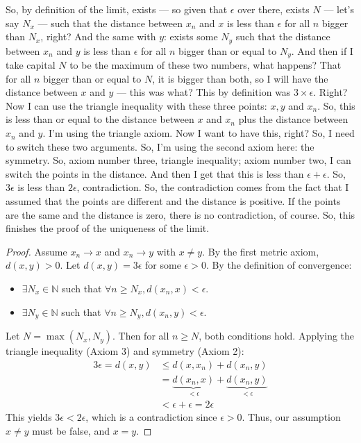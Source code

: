\begin{spoken-clean}[00:11:03 - 00:12:38]
So, by definition of the limit, exists — so given that $\epsilon$ over there, exists $N$ — let's say $N_x$ — such that the distance between $x_n$ and $x$ is less than $\epsilon$ for all $n$ bigger than $N_x$, right? And the same with $y$: exists some $N_y$ such that the distance between $x_n$ and $y$ is less than $\epsilon$ for all $n$ bigger than or equal to $N_y$. And then if I take capital $N$ to be the maximum of these two numbers, what happens? That for all $n$ bigger than or equal to $N$, it is bigger than both, so I will have the distance between $x$ and $y$ — this was what? This by definition was $3 \times \epsilon$. Right? Now I can use the triangle inequality with these three points: $x, y$ and $x_n$. So, this is less than or equal to the distance between $x$ and $x_n$ plus the distance between $x_n$ and $y$. I'm using the triangle axiom. Now I want to have this, right? So, I need to switch these two arguments. So, I'm using the second axiom here: the symmetry. So, axiom number three, triangle inequality; axiom number two, I can switch the points in the distance. And then I get that this is less than $\epsilon + \epsilon$. So, $3\epsilon$ is less than $2\epsilon$, contradiction. So, the contradiction comes from the fact that I assumed that the points are different and the distance is positive. If the points are the same and the distance is zero, there is no contradiction, of course. So, this finishes the proof of the uniqueness of the limit.
\end{spoken-clean}

\begin{math-stroke}
\begin{proof}
Assume $x_n \to x$ and $x_n \to y$ with $x \neq y$. By the first metric axiom, $d(x, y) > 0$. Let $d(x, y) = 3\epsilon$ for some $\epsilon > 0$.
By the definition of convergence:
\begin{itemize}
    \setcounter{enumi}{0} \item $\exists N_x \in \mathbb{N}$ such that $\forall n \ge N_x, d(x_n, x) < \epsilon$.
    \setcounter{enumi}{1} \item $\exists N_y \in \mathbb{N}$ such that $\forall n \ge N_y, d(x_n, y) < \epsilon$.
\end{itemize}
Let $N = \max(N_x, N_y)$. Then for all $n \ge N$, both conditions hold. Applying the triangle inequality (Axiom 3) and symmetry (Axiom 2):
\begin{align*}
3\epsilon = d(x, y) &\le d(x, x_n) + d(x_n, y) \\
&= \underbrace{d(x_n, x)}_{< \epsilon} + \underbrace{d(x_n, y)}_{< \epsilon} \\
&< \epsilon + \epsilon = 2\epsilon
\end{align*}
This yields $3\epsilon < 2\epsilon$, which is a contradiction since $\epsilon > 0$. Thus, our assumption $x \neq y$ must be false, and $x = y$.
\end{proof}
\end{math-stroke}

